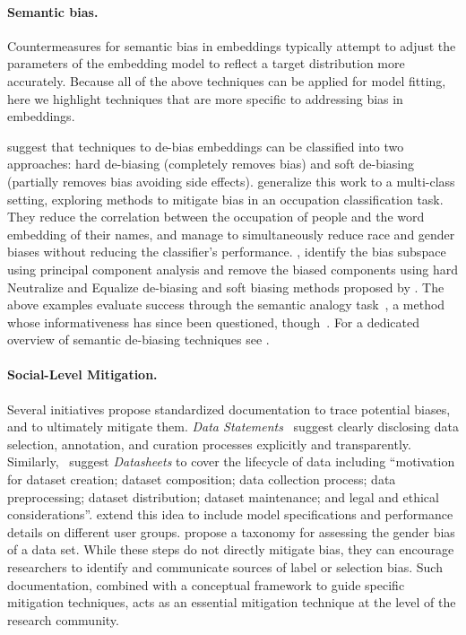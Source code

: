 \documentclass[11pt,a4paper]{article}
\begin{document}
\paragraph{Semantic bias.}
Countermeasures for semantic bias in embeddings typically attempt to adjust the parameters of the embedding model to reflect a target distribution more accurately. 
Because all of the above techniques can be applied for model fitting, here we highlight techniques that are more specific to addressing bias in embeddings. 

 suggest that techniques to de-bias embeddings can be classified into two approaches: hard de-biasing (completely removes bias) and soft de-biasing (partially removes bias avoiding side effects). 
 generalize this work to a multi-class setting, exploring methods to mitigate bias in an occupation classification task. 
They reduce the correlation between the occupation of people and the word embedding of their names, and manage to simultaneously reduce race and gender biases without reducing the classifier's performance. 
, identify the bias subspace using principal component analysis and remove the biased components using hard Neutralize and Equalize de-biasing and soft biasing methods proposed by . 
The above examples evaluate success through the semantic analogy task~\cite{mikolov2013efficient}, a method whose informativeness has since been questioned, though~\cite{nissim2019fair}. For a dedicated overview of semantic de-biasing techniques see .

\paragraph{Social-Level Mitigation.}
Several initiatives propose standardized documentation to trace potential biases, and to ultimately mitigate them. \textit{Data Statements}~ suggest clearly disclosing data selection, annotation, and curation processes explicitly and transparently. 
Similarly,~ suggest \textit{Datasheets} to cover the lifecycle of data including ``motivation for dataset creation; dataset composition; data collection
process; data preprocessing; dataset distribution; dataset
maintenance; and legal and ethical considerations''. 
 extend this idea to include model specifications and performance details on different user groups.
 propose a taxonomy for assessing the gender bias of a data set.
While these steps do not directly mitigate bias, they can encourage researchers to identify and communicate sources of label or selection bias. 
Such documentation, combined with a conceptual framework to guide specific mitigation techniques, acts as an essential mitigation technique at the level of the research community.
\end{document}
